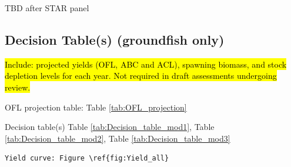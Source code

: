 \documentclass[12pt,]{article}
\begin{document}
TBD after STAR panel

\FloatBarrier

\subsection*{Decision Table(s) (groundfish
only)}\label{decision-tables-groundfish-only}

\hl{Include: projected yields (OFL, ABC and ACL), spawning biomass, and stock 
depletion levels for each year. Not required in draft assessments undergoing review.}

OFL projection table: Table \ref{tab:OFL_projection}

Decision table(s) Table \ref{tab:Decision_table_mod1}, Table
\ref{tab:Decision_table_mod2}, Table \ref{tab:Decision_table_mod3}

\begin{verbatim}
Yield curve: Figure \ref{fig:Yield_all}
\end{verbatim}
\end{document}
